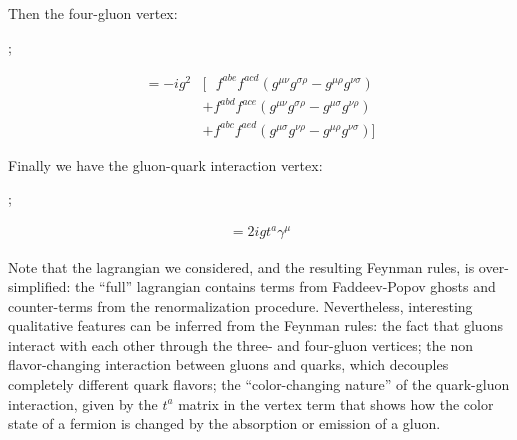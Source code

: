Then the four-gluon vertex:
\begin{center}
    \begin{minipage}{0.4\textwidth}
        \hspace{2cm};
    \end{minipage}
    \begin{minipage}{0.58\textwidth}
        \begin{align}\nonumber = -ig^2&
        [~~~f^{abe}f^{acd}(g^{\mu\nu}g^{\sigma\rho} - g^{\mu\rho}g^{\nu\sigma}) \\\nonumber
        &+f^{abd}f^{ace}(g^{\mu\nu}g^{\sigma\rho} - g^{\mu\sigma}g^{\nu\rho}) \\\nonumber 
        &+f^{abc}f^{aed}(g^{\mu\sigma}g^{\nu\rho} - g^{\mu\rho}g^{\nu\sigma})]
        \end{align}
    \end{minipage}
\end{center}
Finally we have the gluon-quark interaction vertex:
\begin{center}
    \begin{minipage}{0.4\textwidth}
        \hspace{2cm};
    \end{minipage}
    \begin{minipage}{0.58\textwidth}
        \hspace{-1.5cm}\begin{align}\nonumber = 2igt^a\gamma^\mu
        \end{align}
    \end{minipage}
\end{center}
Note that the lagrangian we considered, and the resulting Feynman rules, is over-simplified: the ``full'' lagrangian contains terms from Faddeev-Popov ghosts and counter-terms from the renormalization procedure. Nevertheless, interesting qualitative features can be inferred from the Feynman rules: the fact that gluons interact with each other through the three- and four-gluon vertices; the non flavor-changing interaction between gluons and quarks, which decouples completely different quark flavors; the ``color-changing nature'' of the quark-gluon interaction, given by the $t^a$ matrix in the vertex term that shows how the color state of a fermion is changed by the absorption or emission of a gluon.\\


